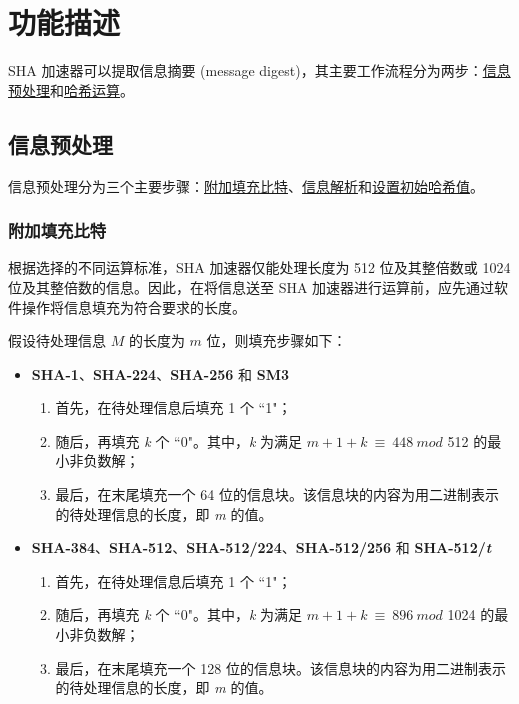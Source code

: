 \documentclass[main\_\_CN.tex]{subfiles}
\begin{document}
\section{功能描述}

SHA 加速器可以提取信息摘要 (message digest)，其主要工作流程分为两步：\hyperref[sec:sha-preprocessing]{信息预处理}和\hyperref[sec:sha-hash-operation]{哈希运算}。

\subsection{信息预处理}\label{sec:sha-preprocessing}

信息预处理分为三个主要步骤：\hyperref[sec:sha-text-padding]{附加填充比特}、\hyperref[sec:sha-parsing-message]{信息解析}和\hyperref[sec:sha-initial-hash]{设置初始哈希值}。

\subsubsection{附加填充比特}\label{sec:sha-text-padding}

根据选择的不同运算标准，SHA 加速器仅能处理长度为 512 位及其整倍数或 1024 位及其整倍数的信息。因此，在将信息送至 SHA 加速器进行运算前，应先通过软件操作将信息填充为符合要求的长度。

假设待处理信息 \begin{math} M \end{math} 的长度为 \begin{math} m \end{math} 位，则填充步骤如下：

\begin{itemize}
    \item \textbf{SHA-1}、\textbf{SHA-224}、\textbf{SHA-256} 和 \textbf{SM3}
    \begin{enumerate}
        \item 首先，在待处理信息后填充 1 个 ``1"；
        \item 随后，再填充 {\it{k}} 个 ``0"。其中，{\it{k}} 为满足 \begin{math}m + 1 + k \ {\equiv} \ 448 \ mod \end{math} 512 的最小非负数解；
        \item 最后，在末尾填充一个 64 位的信息块。该信息块的内容为用二进制表示的待处理信息的长度，即 {\it{m}} 的值。
    \end{enumerate}
    \item \textbf{SHA-384}、\textbf{SHA-512}、\textbf{SHA-512/224}、\textbf{SHA-512/256} 和 \textbf{SHA-512/{\it{t}}}
    \begin{enumerate}
        \item 首先，在待处理信息后填充 1 个 ``1"；
        \item 随后，再填充 {\it{k}} 个 ``0"。其中，{\it{k}} 为满足 \begin{math}m + 1 + k \ {\equiv} \ 896 \ mod \end{math} 1024 的最小非负数解；
        \item 最后，在末尾填充一个 128 位的信息块。该信息块的内容为用二进制表示的待处理信息的长度，即 {\it{m}} 的值。
    \end{enumerate}
\end{itemize}
\end{document}

